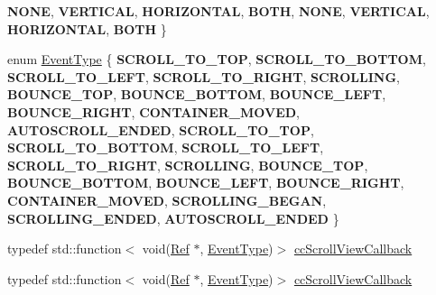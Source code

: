 \begin{DoxyCompactItemize}
{\bfseries N\+O\+NE}, 
{\bfseries V\+E\+R\+T\+I\+C\+AL}, 
{\bfseries H\+O\+R\+I\+Z\+O\+N\+T\+AL}, 
{\bfseries B\+O\+TH}, 
\newline
{\bfseries N\+O\+NE}, 
{\bfseries V\+E\+R\+T\+I\+C\+AL}, 
{\bfseries H\+O\+R\+I\+Z\+O\+N\+T\+AL}, 
{\bfseries B\+O\+TH}
 \}
\item 
enum \hyperlink{classui_1_1ScrollView_ac2a08f5665cbbfbff86fe7abdb6fbb02}{Event\+Type} \{ \newline
{\bfseries S\+C\+R\+O\+L\+L\+\_\+\+T\+O\+\_\+\+T\+OP}, 
{\bfseries S\+C\+R\+O\+L\+L\+\_\+\+T\+O\+\_\+\+B\+O\+T\+T\+OM}, 
{\bfseries S\+C\+R\+O\+L\+L\+\_\+\+T\+O\+\_\+\+L\+E\+FT}, 
{\bfseries S\+C\+R\+O\+L\+L\+\_\+\+T\+O\+\_\+\+R\+I\+G\+HT}, 
\newline
{\bfseries S\+C\+R\+O\+L\+L\+I\+NG}, 
{\bfseries B\+O\+U\+N\+C\+E\+\_\+\+T\+OP}, 
{\bfseries B\+O\+U\+N\+C\+E\+\_\+\+B\+O\+T\+T\+OM}, 
{\bfseries B\+O\+U\+N\+C\+E\+\_\+\+L\+E\+FT}, 
\newline
{\bfseries B\+O\+U\+N\+C\+E\+\_\+\+R\+I\+G\+HT}, 
{\bfseries C\+O\+N\+T\+A\+I\+N\+E\+R\+\_\+\+M\+O\+V\+ED}, 
{\bfseries A\+U\+T\+O\+S\+C\+R\+O\+L\+L\+\_\+\+E\+N\+D\+ED}, 
{\bfseries S\+C\+R\+O\+L\+L\+\_\+\+T\+O\+\_\+\+T\+OP}, 
\newline
{\bfseries S\+C\+R\+O\+L\+L\+\_\+\+T\+O\+\_\+\+B\+O\+T\+T\+OM}, 
{\bfseries S\+C\+R\+O\+L\+L\+\_\+\+T\+O\+\_\+\+L\+E\+FT}, 
{\bfseries S\+C\+R\+O\+L\+L\+\_\+\+T\+O\+\_\+\+R\+I\+G\+HT}, 
{\bfseries S\+C\+R\+O\+L\+L\+I\+NG}, 
\newline
{\bfseries B\+O\+U\+N\+C\+E\+\_\+\+T\+OP}, 
{\bfseries B\+O\+U\+N\+C\+E\+\_\+\+B\+O\+T\+T\+OM}, 
{\bfseries B\+O\+U\+N\+C\+E\+\_\+\+L\+E\+FT}, 
{\bfseries B\+O\+U\+N\+C\+E\+\_\+\+R\+I\+G\+HT}, 
\newline
{\bfseries C\+O\+N\+T\+A\+I\+N\+E\+R\+\_\+\+M\+O\+V\+ED}, 
{\bfseries S\+C\+R\+O\+L\+L\+I\+N\+G\+\_\+\+B\+E\+G\+AN}, 
{\bfseries S\+C\+R\+O\+L\+L\+I\+N\+G\+\_\+\+E\+N\+D\+ED}, 
{\bfseries A\+U\+T\+O\+S\+C\+R\+O\+L\+L\+\_\+\+E\+N\+D\+ED}
 \}
\item 
typedef std\+::function$<$ void(\hyperlink{classRef}{Ref} $\ast$, \hyperlink{classui_1_1ScrollView_ac2a08f5665cbbfbff86fe7abdb6fbb02}{Event\+Type})$>$ \hyperlink{classui_1_1ScrollView_ae836cc55536c3cc4f4db5cb99c3c88d5}{cc\+Scroll\+View\+Callback}
\item 
typedef std\+::function$<$ void(\hyperlink{classRef}{Ref} $\ast$, \hyperlink{classui_1_1ScrollView_ac2a08f5665cbbfbff86fe7abdb6fbb02}{Event\+Type})$>$ \hyperlink{classui_1_1ScrollView_ae836cc55536c3cc4f4db5cb99c3c88d5}{cc\+Scroll\+View\+Callback}
\end{DoxyCompactItemize}
